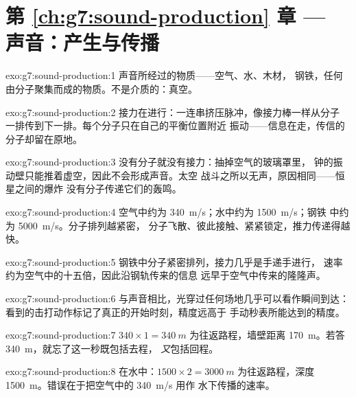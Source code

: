 \section*{第 \ref{ch:g7:sound-production} 章 --- 声音：产生与传播}

\begin{solution}{exo:g7:sound-production:1}
声音所经过的物质——空气、水、木材，
钢铁，任何由分子聚集而成的物质。不是介质的：真空。
\end{solution}

\begin{solution}{exo:g7:sound-production:2}
接力在进行：一连串挤压脉冲，像接力棒一样从分子
一排传到下一排。每个分子只在自己的平衡位置附近
振动——信息在走，传信的分子却留在原地。
\end{solution}

\begin{solution}{exo:g7:sound-production:3}
没有分子就没有接力：抽掉空气的玻璃罩里，
钟的振动壁只能推着虚空，因此不会形成声音。太空
战斗之所以无声，原因相同——恒星之间的爆炸
没有分子传递它们的轰鸣。
\end{solution}

\begin{solution}{exo:g7:sound-production:4}
空气中约为 \qty{340}{m/s}；水中约为 \qty{1500}{m/s}；钢铁
中约为 \qty{5000}{m/s}。分子排列越紧密，
分子飞散、彼此接触、紧紧锁定，推力传递得越快。
\end{solution}

\begin{solution}{exo:g7:sound-production:5}
钢铁中分子紧密排列，接力几乎是手递手进行，
速率约为空气中的十五倍，因此沿钢轨传来的信息
远早于空气中传来的隆隆声。
\end{solution}

\begin{solution}{exo:g7:sound-production:6}
与声音相比，光穿过任何场地几乎可以看作瞬间到达：
看到的击打动作标记了真正的开始时刻，精度远高于
手动秒表所能达到的精度。
\end{solution}

\begin{solution}{exo:g7:sound-production:7}
$340 \times 1 = \qty{340}{m}$ 为往返路程，墙壁距离
\qty{170}{m}。若答 \qty{340}{m}，就忘了这一秒既包括去程，
\emph{又}包括回程。
\end{solution}

\begin{solution}{exo:g7:sound-production:8}
在水中：$1500 \times 2 = \qty{3000}{m}$ 为往返路程，深度
\qty{1500}{m}。错误在于把空气中的 \qty{340}{m/s} 用作
水下传播的速率。
\end{solution}

